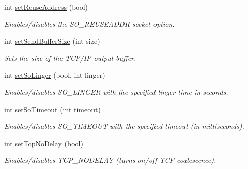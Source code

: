 \begin{DoxyCompactItemize}
\mbox{\label{classcppu_1_1_socket_a27b7fe34e172ad1f97c304d2786f624a}} 
int \mbox{\hyperlink{classcppu_1_1_socket_a27b7fe34e172ad1f97c304d2786f624a}{set\+Reuse\+Address}} (bool)
\begin{DoxyCompactList}\small\item\em Enables/disables the S\+O\+\_\+\+R\+E\+U\+S\+E\+A\+D\+DR socket option. \end{DoxyCompactList}\item 
\mbox{\label{classcppu_1_1_socket_aefda954454d860fa6a6d41b3d5cd26db}} 
int \mbox{\hyperlink{classcppu_1_1_socket_aefda954454d860fa6a6d41b3d5cd26db}{set\+Send\+Buffer\+Size}} (int size)
\begin{DoxyCompactList}\small\item\em Sets the size of the T\+C\+P/\+IP output buffer. \end{DoxyCompactList}\item 
\mbox{\label{classcppu_1_1_socket_ae87eb0335c072f765bf2b6a47162e7f5}} 
int \mbox{\hyperlink{classcppu_1_1_socket_ae87eb0335c072f765bf2b6a47162e7f5}{set\+So\+Linger}} (bool, int linger)
\begin{DoxyCompactList}\small\item\em Enables/disables S\+O\+\_\+\+L\+I\+N\+G\+ER with the specified linger time in seconds. \end{DoxyCompactList}\item 
\mbox{\label{classcppu_1_1_socket_ae5dea30a1cae2dbdbdaf11a9f7ffa444}} 
int \mbox{\hyperlink{classcppu_1_1_socket_ae5dea30a1cae2dbdbdaf11a9f7ffa444}{set\+So\+Timeout}} (int timeout)
\begin{DoxyCompactList}\small\item\em Enables/disables S\+O\+\_\+\+T\+I\+M\+E\+O\+UT with the specified timeout (in milliseconds). \end{DoxyCompactList}\item 
\mbox{\label{classcppu_1_1_socket_a6b29a9e12926b07f65b8dc52176131c5}} 
int \mbox{\hyperlink{classcppu_1_1_socket_a6b29a9e12926b07f65b8dc52176131c5}{set\+Tcp\+No\+Delay}} (bool)
\begin{DoxyCompactList}\small\item\em Enables/disables T\+C\+P\+\_\+\+N\+O\+D\+E\+L\+AY (turns on/off T\+CP coalescence). \end{DoxyCompactList}\item 

\end{DoxyCompactItemize}

